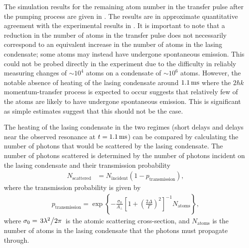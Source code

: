 The simulation results for the remaining atom number in the transfer pulse after the pumping process are given in .  The results are in approximate quantitative agreement with the experimental results in .  It is important to note that a reduction in the number of atoms in the transfer pulse does not necessarily correspond to an equivalent increase in the number of atoms in the lasing condensate; some atoms may instead have undergone spontaneous emission.  This could not be probed directly in the experiment due to the difficulty in reliably measuring changes of $\sim 10^4$ atoms on a condensate of $\sim 10^6$ atoms.  However, the notable absence of heating of the lasing condensate around $\unit[1.1]{ms}$ where the $2 \hbar k$ momentum-transfer process is expected to occur suggests that relatively few of the atoms are likely to have undergone spontaneous emission.  This is significant as simple estimates suggest that this should not be the case.

The heating of the lasing condensate in the two regimes (short delays and delays near the observed resonance at $t = \unit[1.1]{ms}$) can be compared by calculating the number of photons that would be scattered by the lasing condensate.  The number of photons scattered is determined by the number of photons incident on the lasing condensate and their transmission probability
\begin{align}
    N_\text{scattered} &= N_\text{incident} (1 - p_\text{transmission}),
\end{align}
where the transmission probability is given by
\begin{align}
    p_\text{transmission} = \exp \left\{- \frac{\sigma_0}{A_\perp} \left[1 + \left(\frac{2 \Delta}{\Gamma}\right)^2\right]^{-1} N_\text{atoms}  \right\},
\end{align}
where $\sigma_0 = \left.{3 \lambda^2}\middle/{2 \pi}\right.$ is the atomic scattering cross-section, and $N_\text{atoms}$ is the number of atoms in the lasing condensate that the photons must propagate through.

